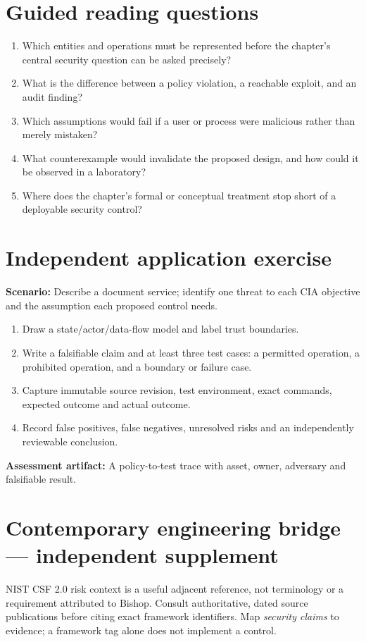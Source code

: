\documentclass[10pt,letterpaper]{article}
\begin{document}
\section{Guided reading questions}
\begin{enumerate}
\item Which entities and operations must be represented before the chapter's central security question can be asked precisely?
\item What is the difference between a policy violation, a reachable exploit, and an audit finding?
\item Which assumptions would fail if a user or process were malicious rather than merely mistaken?
\item What counterexample would invalidate the proposed design, and how could it be observed in a laboratory?
\item Where does the chapter's formal or conceptual treatment stop short of a deployable security control?
\end{enumerate}
\section{Independent application exercise}
\textbf{Scenario:} Describe a document service; identify one threat to each CIA objective and the assumption each proposed control needs.
\begin{enumerate}
\item Draw a state/actor/data-flow model and label trust boundaries.
\item Write a falsifiable claim and at least three test cases: a permitted operation, a prohibited operation, and a boundary or failure case.
\item Capture immutable source revision, test environment, exact commands, expected outcome and actual outcome.
\item Record false positives, false negatives, unresolved risks and an independently reviewable conclusion.
\end{enumerate}
\textbf{Assessment artifact:} A policy-to-test trace with asset, owner, adversary and falsifiable result.
\section{Contemporary engineering bridge --- independent supplement}
NIST CSF 2.0 risk context is a useful adjacent reference, not terminology or a requirement attributed to Bishop. Consult authoritative, dated source publications before citing exact framework identifiers. Map \emph{security claims} to evidence; a framework tag alone does not implement a control.
\end{document}
